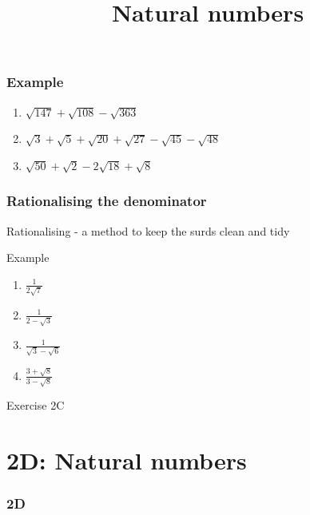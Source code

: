 \documentclass[
	11pt, %
]{beamer}
\begin{document}
\begin{frame}[t]
    \frametitle{Example}
    \begin{enumerate}
        \item $\sqrt{147} + \sqrt{108} - \sqrt{363}$
        \item $\sqrt{3} + \sqrt{5} + \sqrt{20} + \sqrt{27} - \sqrt{45} - \sqrt{48}$
        \item $\sqrt{50} + \sqrt{2} - 2\sqrt{18} + \sqrt{8}$
    \end{enumerate}
\end{frame}

\begin{frame}[t]
    \frametitle{Rationalising the \textbf{denominator}}
    Rationalising - a method to keep the surds clean and tidy\\
    \begin{block}{Example}
        \begin{enumerate}
            \item $\frac{1}{2\sqrt{7}}$
            \item $\frac{1}{2 - \sqrt{3}}$
            \item $\frac{1}{\sqrt{3} - \sqrt{6}}$
            \item $\frac{3 + \sqrt{8}}{3 - \sqrt{8}}$
        \end{enumerate}
    \end{block}
\end{frame}
\begin{frame}    
\end{frame}

\begin{frame}{Exercise 2C}
\end{frame}
\section{2D: Natural numbers}
\begin{frame} 
    \frametitle{2D}
    \begin{center}
        \title{Natural numbers}
        \maketitle
    \end{center}
\end{frame}
\end{document}
